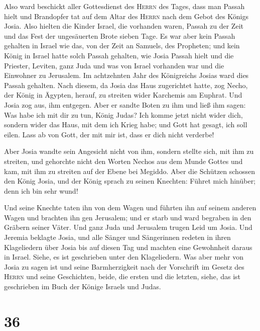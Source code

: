  Also ward beschickt aller Gottesdienst des
\textsc{Herrn} des Tages, dass man Passah hielt und Brandopfer tat auf
dem Altar des \textsc{Herrn} nach dem Gebot des Königs Josia.
 Also hielten die Kinder Israel, die vorhanden waren,
Passah zu der Zeit und das Fest der ungesäuerten Brote sieben Tage.
 Es war aber kein Passah gehalten in Israel wie das, von
der Zeit an Samuels, des Propheten; und kein König in Israel hatte solch
Passah gehalten, wie Josia Passah hielt und die Priester, Leviten, ganz
Juda und was von Israel vorhanden war und die Einwohner zu Jerusalem.
 Im achtzehnten Jahr des Königreichs Josias ward dies
Passah gehalten.  Nach diesem, da Josia das Haus
zugerichtet hatte, zog Necho, der König in Ägypten, herauf, zu streiten
wider Karchemis am Euphrat. Und Josia zog aus, ihm entgegen.
 Aber er sandte Boten zu ihm und ließ ihm sagen: Was habe
ich mit dir zu tun, König Judas? Ich komme jetzt nicht wider dich,
sondern wider das Haus, mit dem ich Krieg habe; und Gott hat gesagt, ich
soll eilen. Lass ab von Gott, der mit mir ist, dass er dich nicht
verderbe!

 Aber Josia wandte sein Angesicht nicht von ihm, sondern
stellte sich, mit ihm zu streiten, und gehorchte nicht den Worten Nechos
aus dem Munde Gottes und kam, mit ihm zu streiten auf der Ebene bei
Megiddo.  Aber die Schützen schossen den König Josia, und
der König sprach zu seinen Knechten: Führet mich hinüber; denn ich bin
sehr wund!

 Und seine Knechte taten ihn von dem Wagen und führten
ihn auf seinem anderen Wagen und brachten ihn gen Jerusalem; und er
starb und ward begraben in den Gräbern seiner Väter. Und ganz Juda und
Jerusalem trugen Leid um Josia.  Und Jeremia beklagte
Josia, und alle Sänger und Sängerinnen redeten in ihren Klageliedern
über Josia bis auf diesen Tag und machten eine Gewohnheit daraus in
Israel. Siehe, es ist geschrieben unter den Klageliedern.
 Was aber mehr von Josia zu sagen ist und seine
Barmherzigkeit nach der Vorschrift im Gesetz des \textsc{Herrn}
 und seine Geschichten, beide, die ersten und die
letzten, siehe, das ist geschrieben im Buch der Könige Israels und
Judas.

\hypertarget{section-35}{%
\section{36}\label{section-35}}

